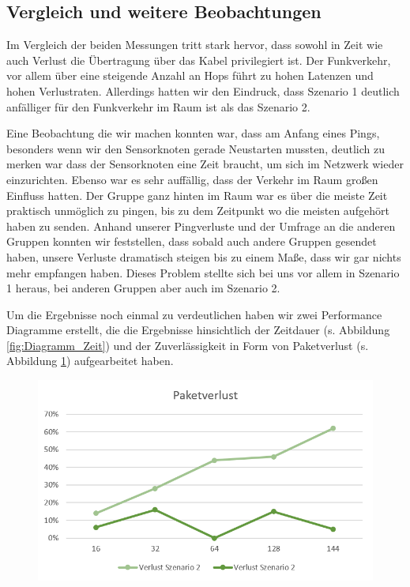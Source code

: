 \documentclass[]{scrartcl}
\begin{document}
\subsection{Vergleich und weitere Beobachtungen}

Im Vergleich der beiden Messungen tritt stark hervor, dass sowohl in Zeit wie auch Verlust die Übertragung über das Kabel privilegiert ist. Der Funkverkehr, vor allem über eine steigende Anzahl an Hops führt zu hohen Latenzen und hohen Verlustraten. Allerdings hatten wir den Eindruck, dass Szenario 1 deutlich anfälliger für den Funkverkehr im Raum ist als das Szenario 2.

Eine Beobachtung die wir machen konnten war, dass am Anfang eines Pings, besonders wenn wir den Sensorknoten gerade Neustarten mussten, deutlich zu merken war dass der Sensorknoten eine Zeit braucht, um sich im Netzwerk wieder einzurichten. Ebenso war es sehr auffällig, dass der Verkehr im Raum großen Einfluss hatten. Der Gruppe ganz hinten im Raum war es über die meiste Zeit praktisch unmöglich zu pingen, bis zu dem Zeitpunkt wo die meisten aufgehört haben zu senden. Anhand unserer Pingverluste und der Umfrage an die anderen Gruppen konnten wir feststellen, dass sobald auch andere Gruppen gesendet haben, unsere Verluste dramatisch steigen bis zu einem Maße, dass wir gar nichts mehr empfangen haben. Dieses Problem stellte sich bei uns vor allem in Szenario 1 heraus, bei anderen Gruppen aber auch im Szenario 2.

Um die Ergebnisse noch einmal zu verdeutlichen haben wir zwei Performance Diagramme erstellt, die die Ergebnisse hinsichtlich der Zeitdauer (s. Abbildung \ref{fig:Diagramm_Zeit}) und der Zuverlässigkeit in Form von Paketverlust (s. Abbildung \ref{fig:Diagramm_Paketverlust}) aufgearbeitet haben.

\begin{figure}[H]
	\centering
	\includegraphics[width=1\linewidth]{Paketverlust.png}
	\label{fig:Diagramm_Paketverlust}
\end{figure}
\end{document}

